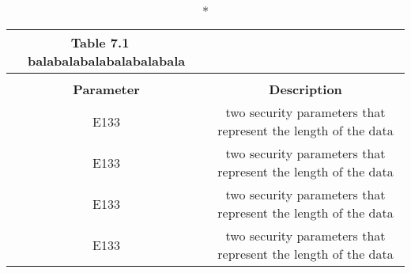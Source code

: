 \documentclass[12pt, a4paper, oneside]{ctexart}
\begin{document}
\begin{longtable}{|c|c|}\caption*{Table 7.1$\quad$balabalabalabalabalabala}\\\hline
	\endfirsthead
\\\hline
	\endhead
	
	\endfoot

	\endlastfoot
    \textbf{Parameter} & \textbf{Description} \\\hline
    E133   & two security parameters that represent the length of the data  \\\hline
      E133   & two security parameters that represent the length of the data  \\\hline  E133   & two security parameters that represent the length of the data  \\\hline  E133   & two security parameters that represent the length of the data  \\\hline
\end{longtable}













\end{document}
